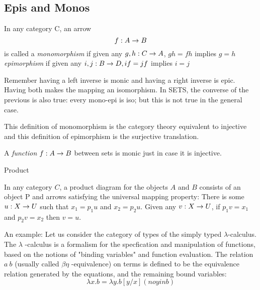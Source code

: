 \documentclass[../../notes.tex]{subfiles}
\begin{document}
\subsection{Epis and Monos}

\begin{definition}

  In any category C, an arrow $$ f : A \rightarrow B $$ is
  called a \textit{monomorphism} if given any $ g, h : C \rightarrow A$,
  $gh = fh$ implies $g = h$ \\

  \textit{epimorphism} if given any $i,j : B \rightarrow D, if = jf$ implies $i = j$


\end{definition}

Remember having a left inverse is monic and having a right inverse is epic. Having both makes the mapping an isomorphism. In SETS, the converse of the previous is also true: every mono-epi is iso; but this is not true in the general case.

This definition of monomorphism is the category theory equivalent to injective and this definition of epimorphism is the surjective translation.


\begin{proposition}

  A \textit{function} $ f : A \rightarrow B$ between sets is monic just in case it is injective. 
  
\end{proposition}

% 

\begin{definition}{Product}

  In any category $C$, a product diagram for the objects $A$ and $B$
  consists of an object P and arrows
  satisfying the universal mapping property: There is some $u: X \rightarrow U$
  such that $x_1 = p_1u$ and $x_2 = p_{2}u$. Given any $v: X \rightarrow U$, if
  $p_{1}v = x_1$ and $p_{2}v = x_2$ then $v = u$.
\end{definition}

An example:
Let us consider the category of types of the simply typed $\lambda$-calculus.
The $\lambda$ -calculus is a formalism for the specfication and manipulation of functions, based
on the notions of "binding variables" and function evaluation. The relation $ a ~ b $
(usually called $\beta\eta$ -equivalence) on terms is defined to be the equivalence relation
generated by the equations, and the remaining bound variables:
$$ \lambda x.b = \lambda y.b [y/x] (no y in b) $$
\end{document}
